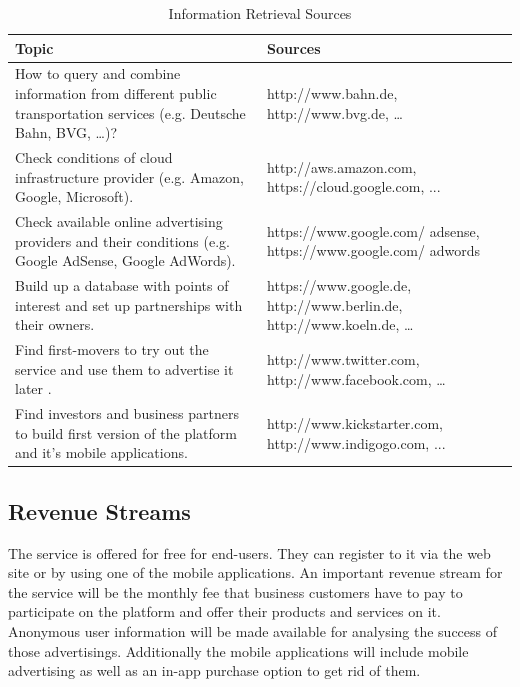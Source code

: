 \documentclass[a4paper]{article}
\begin{document}
\begin{table}[ht]
\begin{tabular}{|p{}|p{}|}
\hline
\textbf{Topic} & \textbf{Sources} \\
\hline
     How to query and combine information from different public transportation services (e.g. Deutsche Bahn, BVG, …)?   &  http://www.bahn.de, http://www.bvg.de, … \\
\hline
     Check conditions of cloud infrastructure provider (e.g. Amazon, Google, Microsoft).
    & http://aws.amazon.com, https://cloud.google.com, ... \\
\hline
     Check available online advertising providers and their conditions (e.g. Google AdSense, Google AdWords).
    & https://www.google.com/ adsense, https://www.google.com/ adwords \\
\hline
     Build up a database with points of interest and set up partnerships with their owners.
    & https://www.google.de, http://www.berlin.de, http://www.koeln.de, … \\
\hline
     Find first-­movers to try out the service and use them to advertise it later .
    & http://www.twitter.com, http://www.facebook.com, … \\
\hline
    Find investors and business partners to build first version of the platform and it's mobile applications.
    & http://www.kickstarter.com, http://www.indigogo.com, ... \\
\hline
\end{tabular}
\caption{Information Retrieval Sources}
\label{tab:inforetrieval}
\end{table}

\subsection{Revenue Streams}
\label{subsec:revenue}

The service is offered for free for end-users. They can register to it via the web site or by using one of the mobile applications. An important revenue stream for the service will be the monthly fee that business customers have to pay to participate on the platform and offer their products and services on it. Anonymous user information will be made available for analysing the success of those advertisings. Additionally the mobile applications will include mobile advertising as well as an in-app purchase option to get rid of them.

\end{document}
